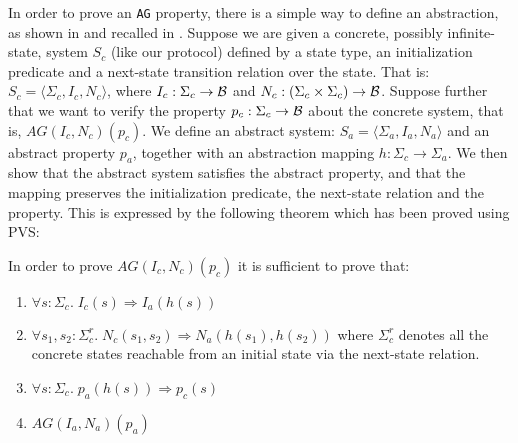In order to prove an {\tt AG} property, 
there  is  a  simple  way  to  define an   abstraction,  as  shown  in
\cite{CGL:Model.Check.Abstr} and recalled in \cite{SS:PVS.Integration}. 
Suppose we are given a concrete, possibly infinite-state, system $S_c$
(like  our   protocol)  defined by a    state type,  an initialization
predicate and a  next-state transition relation over  the state.  That
is: $S_c = \langle
\Sigma_c,I_c,N_c\rangle$,
where $I_c  : \Sigma_c  \rightarrow  \cal{B}$  and $N_c :  (\Sigma_c  \times
\Sigma_c) \rightarrow \cal{B}$. Suppose further that we want to verify  the 
property  $p_c :  \Sigma_c  \rightarrow \cal{B}$  about the concrete system,
that is,   $AG(I_c,N_c)(p_c)$.
We define an abstract system:  $S_a = \langle \Sigma_a,I_a,N_a\rangle$
and an abstract  property $p_a$, together  with an abstraction mapping
$h : \Sigma_c \rightarrow \Sigma_a$.  We then show that the abstract system 
satisfies the abstract  property, and  that the  mapping  preserves the 
initialization predicate, the next-state relation and the property. This
is expressed by the following theorem which has been proved using PVS:
\begin{theorem}\label{theorem-abstraction}
In   order to  prove  
$AG(I_c,N_c)(p_c)$ it   is
sufficient to prove that:
\begin{enumerate}
\item $\forall s:\Sigma_c.\; I_c(s) \Rightarrow I_a(h(s))$

\item $\forall s_1,s_2:\Sigma_c^r.\; 
          N_c(s_1,s_2) \Rightarrow N_a(h(s_1),h(s_2))$
      where $\Sigma_c^r$ denotes all the concrete states reachable from 
      an initial state via the next-state relation.

\item $\forall s:\Sigma_c.\; p_a(h(s)) \Rightarrow p_c(s)$

\item $AG(I_a,N_a)(p_a)$
\end{enumerate}
\end{theorem}


